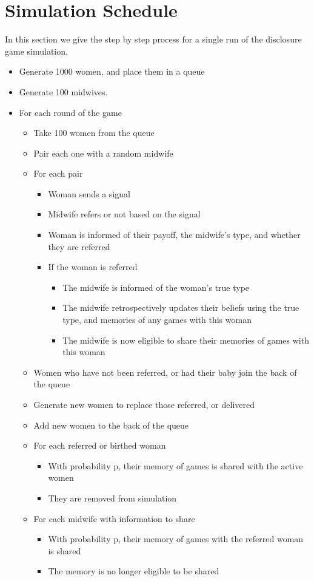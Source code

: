 
\section{Simulation Schedule}
\label{app:sim_schedule}

In this section we give the step by step process for a single run of the disclosure game simulation.

\begin{itemize}
\item Generate 1000 women, and place them in a queue
\item Generate 100 midwives.
\item For each round of the game
\begin{itemize}
\item Take 100 women from the queue
\item Pair each one with a random midwife
\item For each pair
\begin{itemize}
\item Woman sends a signal
\item Midwife refers or not based on the signal
\item Woman is informed of their payoff, the midwife's type, and whether they are referred
\item If the woman is referred
\begin{itemize}
\item The midwife is informed of the woman's true type
\item The midwife retrospectively updates their beliefs using the true type, and memories of any games with this woman
\item The midwife is now eligible to share their memories of games with this woman
\end{itemize}
\end{itemize}
\item Women who have not been referred, or had their baby join the back of the queue
\item Generate new women to replace those referred, or delivered
\item Add new women to the back of the queue
\item For each referred or birthed woman
\begin{itemize}
\item With probability p, their memory of games is shared with the active women
\item They are removed from simulation
\end{itemize}
\item For each midwife with information to share
\begin{itemize}
\item With probability p, their memory of games with the referred woman is shared
\item The memory is no longer eligible to be shared
\end{itemize}
\end{itemize}
\end{itemize}